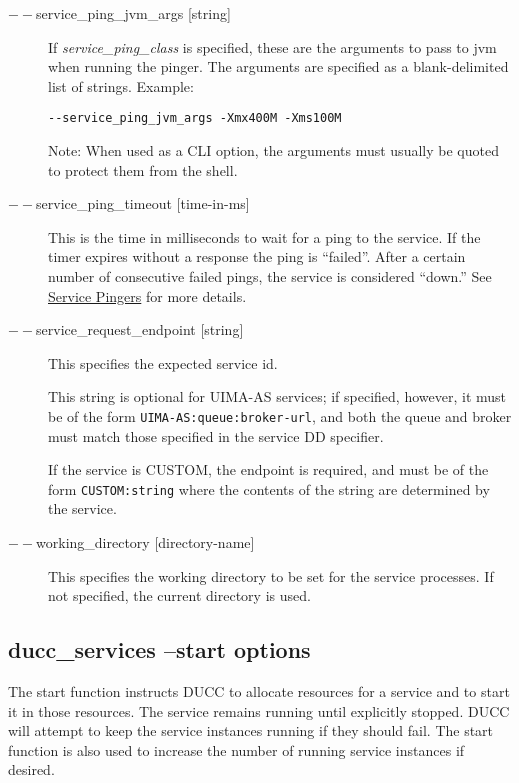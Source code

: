 \begin{description}
      \item[$--$service\_ping\_jvm\_args {[string]}] If 
        {\em service\_ping\_class} is specified, these are the arguments 
        to pass to jvm when running the pinger. The arguments are specified as a blank-delimited
        list of strings.  Example:
\begin{verbatim}
--service_ping_jvm_args -Xmx400M -Xms100M
\end{verbatim}
        
        Note: When used as a CLI option, the arguments must usually be
        quoted to protect them from the shell.

      \item[$--$service\_ping\_timeout {[time-in-ms]}] This is the time in milliseconds to wait for a
        ping to the service.  If the timer expires without a response the ping is ``failed''. After
        a certain number of consecutive failed pings, the service is considered ``down.''  See
        \hyperref[sec:service.pingers]{Service Pingers} for more details.

      \item[$--$service\_request\_endpoint {[string]}] This specifies the expected service id.  
        \begin{sloppypar}
          This string is optional for UIMA-AS services; if specified, however, it must be of the
          form {\tt UIMA-AS:queue:broker-url}, and both the queue and broker must match those specified in the
          service DD specifier.
        \end{sloppypar}

        If the service is CUSTOM, the endpoint is required, and must be of the form
        {\tt CUSTOM:string} where the contents of the string are determined by the service.
        
        \item[$--$working\_directory {[directory-name]}]
          This specifies the working directory to be set for the service processes. 
          If not specified, the current directory is used.
    \end{description}


    \subsection{ducc\_services --start options}

    The start function instructs DUCC to allocate resources for a service and to start it in those
    resources. The service remains running until explicitly stopped. DUCC will attempt to keep the
    service instances running if they should fail. The start function is also used to increase the
    number of running service instances if desired.
    
